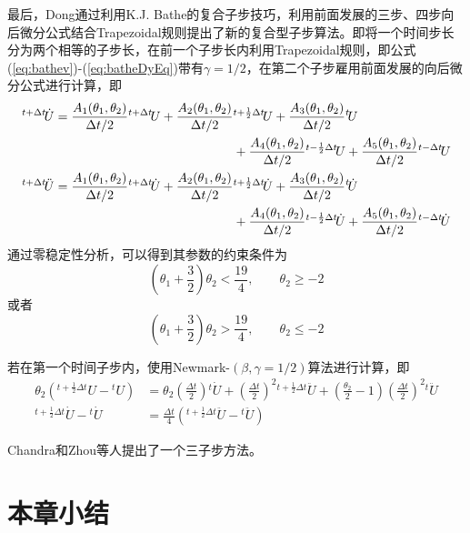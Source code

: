最后，Dong通过利用K.J. Bathe的复合子步技巧，利用前面发展的三步、四步向后微分公式结合Trapezoidal规则提出了新的复合型子步算法\cite{Dong2010}。即将一个时间步长分为两个相等的子步长，在前一个子步长内利用Trapezoidal规则，即公式(\ref{eq:bathev})-(\ref{eq:batheDyEq})带有$\gamma=1/2$，在第二个子步雇用前面发展的向后微分公式进行计算，即
\begin{align}
{^{t+\Delta t}\!\dot{U}}=\frac{A_1(\theta_1,\theta_2)}{\Delta t/2}{^{t+\Delta t}\!U}+\frac{A_2(\theta_1,\theta_2)}{\Delta t/2}&{^{t+\frac{1}{2}\Delta t}\!U}+\frac{A_3(\theta_1,\theta_2)}{\Delta t/2}{^{t}\!U}\notag\\
&+\frac{A_4(\theta_1,\theta_2)}{\Delta t/2}{^{t-\frac{1}{2}\Delta t}\!U}+\frac{A_5(\theta_1,\theta_2)}{\Delta t/2}{^{t-\Delta t}\!U}\\
{^{t+\Delta t}\!\ddot{U}}=\frac{A_1(\theta_1,\theta_2)}{\Delta t/2}{^{t+\Delta t}\!\dot{U}}+\frac{A_2(\theta_1,\theta_2)}{\Delta t/2}&{^{t+\frac{1}{2}\Delta t}\!\dot{U}}+\frac{A_3(\theta_1,\theta_2)}{\Delta t/2}{^{t}\!\dot{U}}\notag\\
&+\frac{A_4(\theta_1,\theta_2)}{\Delta t/2}{^{t-\frac{1}{2}\Delta t}\!\dot{U}}+\frac{A_5(\theta_1,\theta_2)}{\Delta t/2}{^{t-\Delta t}\!\dot{U}}
\end{align}
通过零稳定性分析，可以得到其参数的约束条件为
\begin{equation}
(\theta_1+\frac{3}{2})\theta_2<\frac{19}{4},\qquad\theta_2\ge-2
\end{equation}
或者
\begin{equation}
(\theta_1+\frac{3}{2})\theta_2>\frac{19}{4},\qquad\theta_2\le-2
\end{equation}

若在第一个时间子步内，使用Newmark-$(\beta,\gamma=1/2)$算法\cite{book:dover}进行计算，即
\begin{align}
\theta_2({^{t+\frac{1}{2}\Delta t}\!U}-{^t\!U})&=\theta_2\left(\frac{\Delta t}{2}\right){^{t}\!\dot{U}}+\left(\frac{\Delta t}{2}\right)^2{^{t+\frac{1}{2}\Delta t}\!\ddot{U}}+\left(\frac{\theta_2}{2}-1\right)\left(\frac{\Delta t}{2}\right)^2{^{t}\!\ddot{U}}\\
{^{t+\frac{1}{2}\Delta t}\!\dot{U}}-{^t\!\dot{U}}&=\frac{\Delta t}{4}({^{t+\frac{1}{2}\Delta t}\!\ddot{U}}-{^{t}\!\ddot{U}})
\end{align}


Chandra和Zhou等人提出了一个三子步方法。

\section{本章小结}

